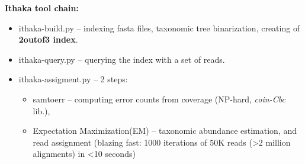 \documentclass[portrait,final,a0paper,fontscale=0.277]{baposter}
\begin{document}
\begin{poster}
{%
%
\hspace{-1em}
\begin{minipage}{0.46\textwidth}
{\bf Ithaka tool chain:}
\vspace{-0.7em}
\begin{itemize}[leftmargin=*]
\setlength\itemsep{-0.2em}
\item ithaka-build.py -- indexing fasta files, taxonomic tree binarization, creating of {\bf 2outof3 index}.
\item ithaka-query.py -- querying the index with a set of reads. 
\item ithaka-assigment.py -- 2 steps:
\vspace{-1em}
\begin{itemize}[leftmargin=0.5em]
\setlength\itemsep{-0.2em}
\item samtoerr -- computing error counts from coverage (NP-hard, {\em coin-Cbc} lib.), 
\item Expectation Maximization(EM) -- taxonomic abundance estimation, and read assignment (blazing fast: 1000 iterations of 50K reads (>2 million alignments) in <10 seconds)
\end{itemize}
\end{itemize}
\vspace{-0.7em}
%

\end{minipage}}
\end{poster}
\end{document}
